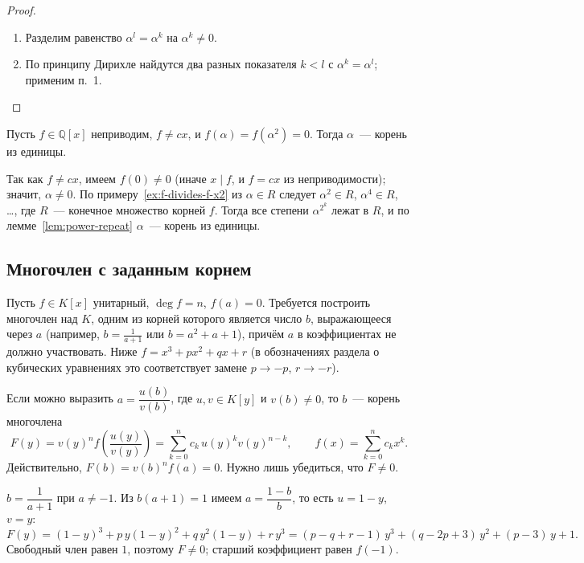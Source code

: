 \documentclass[12pt]{article}
\begin{document}
	\begin{proof}
		\begin{enumerate}
			\item Разделим равенство $\alpha^l = \alpha^k$ на $\alpha^k \ne 0$.
			\item По принципу Дирихле найдутся два разных показателя $k < l$ с $\alpha^k = \alpha^l$; применим п.~1.
		\end{enumerate}
	\end{proof}

	\begin{example}
		Пусть $f \in \mathbb{Q}[x]$ неприводим, $f \ne cx$, и $f(\alpha) = f(\alpha^2) = 0$. Тогда $\alpha$~--- корень из единицы.

		Так как $f \ne cx$, имеем $f(0) \ne 0$ (иначе $x \mid f$, и $f = cx$ из неприводимости); значит, $\alpha \ne 0$. По примеру~\ref{ex:f-divides-f-x2} из $\alpha \in R$ следует $\alpha^2 \in R$, $\alpha^4 \in R$, \dots, где $R$~--- конечное множество корней $f$. Тогда все степени $\alpha^{2^k}$ лежат в $R$, и по лемме~\ref{lem:power-repeat} $\alpha$~--- корень из единицы.
	\end{example}

	\subsection{Многочлен с заданным корнем}

	Пусть $f \in K[x]$ унитарный, $\deg f = n$, $f(a) = 0$. Требуется построить многочлен над $K$, одним из корней которого является число $b$, выражающееся через $a$ (например, $b = \frac{1}{a + 1}$ или $b = a^2 + a + 1$), причём $a$ в коэффициентах не должно участвовать. Ниже $f = x^3 + px^2 + qx + r$ (в обозначениях раздела о кубических уравнениях это соответствует замене $p \to -p$, $r \to -r$).

	\begin{method}[подстановка]\label{met:substitution}
		Если можно выразить $a = \dfrac{u(b)}{v(b)}$, где $u, v \in K[y]$ и $v(b) \ne 0$, то $b$~--- корень многочлена
		\[
			F(y) = v(y)^n f\!\left( \frac{u(y)}{v(y)} \right) = \sum_{k = 0}^{n} c_k\, u(y)^k v(y)^{n - k}, \qquad f(x) = \sum_{k=0}^{n} c_kx^k.
		\]
		Действительно, $F(b) = v(b)^n f(a) = 0$. Нужно лишь убедиться, что $F \ne 0$.
	\end{method}

	\begin{example}
		$b = \dfrac{1}{a + 1}$ при $a \ne -1$. Из $b(a + 1) = 1$ имеем $a = \dfrac{1 - b}{b}$, то есть $u = 1 - y$, $v = y$:
		\[
			F(y) = (1 - y)^3 + p\,y(1 - y)^2 + q\,y^2(1 - y) + r\,y^3 = (p - q + r - 1)\,y^3 + (q - 2p + 3)\,y^2 + (p - 3)\,y + 1.
		\]
		Свободный член равен $1$, поэтому $F \ne 0$; старший коэффициент равен $f(-1)$.
	\end{example}
\end{document}
